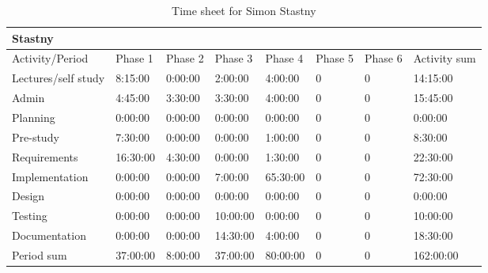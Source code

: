 \documentclass[11pt]{book}
\begin{document}
\begin{table}[H]
\centering
\begin{tabular}{| l | l | l | l | l | l | l | l |}
    \hline
    Stastny             &             &             &             &             &             &             &                 \\ \hline          
    Activity/Period     & Phase 1     & Phase 2     & Phase  3    & Phase 4     & Phase 5     & Phase 6     & Activity sum    \\ \hline
    Lectures/self study & 8:15:00     & 0:00:00     & 2:00:00     & 4:00:00     & 0           & 0           & 14:15:00        \\ \hline
    Admin               & 4:45:00     & 3:30:00     & 3:30:00     & 4:00:00     & 0           & 0           & 15:45:00        \\ \hline
    Planning            & 0:00:00     & 0:00:00     & 0:00:00     & 0:00:00     & 0           & 0           & 0:00:00         \\ \hline
    Pre-study           & 7:30:00     & 0:00:00     & 0:00:00     & 1:00:00     & 0           & 0           & 8:30:00         \\ \hline
    Requirements        & 16:30:00    & 4:30:00     & 0:00:00     & 1:30:00     & 0           & 0           & 22:30:00        \\ \hline
    Implementation      & 0:00:00     & 0:00:00     & 7:00:00     & 65:30:00    & 0           & 0           & 72:30:00        \\ \hline
    Design              & 0:00:00     & 0:00:00     & 0:00:00     & 0:00:00     & 0           & 0           & 0:00:00         \\ \hline
    Testing             & 0:00:00     & 0:00:00     & 10:00:00    & 0:00:00     & 0           & 0           & 10:00:00        \\ \hline
    Documentation       & 0:00:00     & 0:00:00     & 14:30:00    & 4:00:00     & 0           & 0           & 18:30:00        \\ \hline
    Period sum          & 37:00:00    & 8:00:00     & 37:00:00    & 80:00:00    & 0           & 0           & 162:00:00       \\ \hline
\end{tabular}
\caption{Time sheet for Simon Stastny}
\label{tab:appendix_timesheets_simon}
\end{table}
\end{document}
